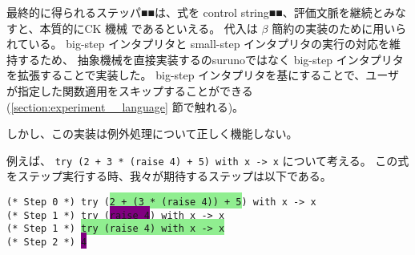 最終的に得られるステッパ■■は、式を control string■■、評価文脈を継続とみなすと、本質的にCK 機械 \cite{FF1986} であるといえる。
代入は $\beta$ 簡約の実装のために用いられている。
big-step インタプリタと small-step インタプリタの実行の対応を維持するため、
抽象機械を直接実装するのsurunoではなく big-step インタプリタを拡張することで実装した。
big-step インタプリタを基にすることで、ユーザが指定した関数適用をスキップすることができる
(\ref{section:experiment__language} 節で触れる)。

しかし、この実装は例外処理について正しく機能しない。

例えば、 \texttt{try (2 + 3 * (raise 4) + 5) with x -> x} について考える。
この式をステップ実行する時、我々が期待するステップは以下である。

\vspace{0.2cm}

\noindent \texttt{(* Step 0 *) try (\colorbox{lightgreen}{2 + (3 * (raise 4)) + 5}) with x -> x\\
  (* Step 1 *) try (\colorbox{purple}{raise 4}) with x -> x\\
  (* Step 1 *) \colorbox{lightgreen}{try (raise 4) with x -> x}\\
  (* Step 2 *) \colorbox{purple}{4}\\
}

\vspace{0.2cm}

